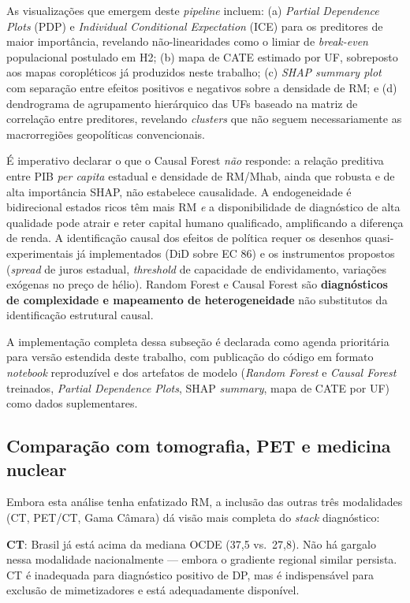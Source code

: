 \documentclass[12pt,a4paper,oneside]{article}
\begin{document}
As visualizações que emergem deste \textit{pipeline} incluem:
(a) \textit{Partial Dependence Plots} (PDP) e \textit{Individual
Conditional Expectation} (ICE) para os preditores de maior
importância, revelando não-linearidades como o limiar de
\textit{break-even} populacional postulado em H2; (b) mapa de
CATE estimado por UF, sobreposto aos mapas coropléticos já
produzidos neste trabalho; (c) \textit{SHAP summary plot} com
separação entre efeitos positivos e negativos sobre a densidade
de RM; e (d) dendrograma de agrupamento hierárquico das UFs
baseado na matriz de correlação entre preditores, revelando
\textit{clusters} que não seguem necessariamente as macrorregiões
geopolíticas convencionais.

É imperativo declarar o que o Causal Forest \textit{não} responde:
a relação preditiva entre PIB \textit{per capita} estadual e
densidade de RM/Mhab, ainda que robusta e de alta importância
SHAP, não estabelece causalidade. A endogeneidade é bidirecional
\textemdash{} estados ricos têm mais RM \textit{e} a
disponibilidade de diagnóstico de alta qualidade pode atrair e
reter capital humano qualificado, amplificando a diferença de
renda. A identificação causal dos efeitos de política requer os
desenhos quasi-experimentais já implementados (DiD sobre EC 86)
e os instrumentos propostos (\textit{spread} de juros estadual,
\textit{threshold} de capacidade de endividamento, variações
exógenas no preço de hélio). Random Forest e Causal Forest são
\textbf{diagnósticos de complexidade e mapeamento de
heterogeneidade} \textemdash{} não substitutos da identificação
estrutural causal.

A implementação completa dessa subseção é declarada como agenda
prioritária para versão estendida deste trabalho, com publicação
do código em formato \textit{notebook} reproduzível e dos
artefatos de modelo (\textit{Random Forest} e \textit{Causal
Forest} treinados, \textit{Partial Dependence Plots}, SHAP
\textit{summary}, mapa de CATE por UF) como dados suplementares.

\subsection{Comparação com tomografia, PET e medicina nuclear}

Embora esta análise tenha enfatizado RM, a inclusão das outras três
modalidades (CT, PET/CT, Gama Câmara) dá visão mais completa do
\textit{stack} diagnóstico:

\textbf{CT}: Brasil já está acima da mediana OCDE (37,5 vs.\ 27,8).
Não há gargalo nessa modalidade nacionalmente — embora o gradiente
regional similar persista. CT é inadequada para diagnóstico
positivo de DP, mas é indispensável para exclusão de mimetizadores e
está adequadamente disponível.
\end{document}
